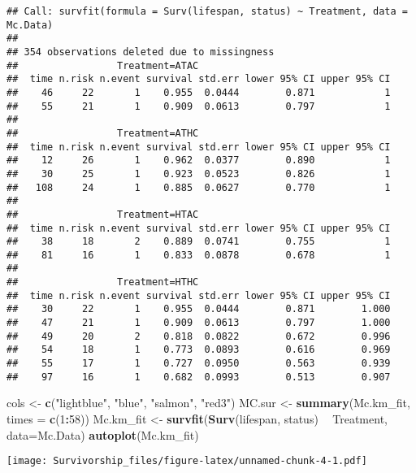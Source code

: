\documentclass[]{article}
\newenvironment{Shaded}{\begin{snugshade}}{\end{snugshade}}
\newcommand{\KeywordTok}[1]{\textcolor[rgb]{0.13,0.29,0.53}{\textbf{#1}}}
\newcommand{\DataTypeTok}[1]{\textcolor[rgb]{0.13,0.29,0.53}{#1}}
\newcommand{\DecValTok}[1]{\textcolor[rgb]{0.00,0.00,0.81}{#1}}
\newcommand{\StringTok}[1]{\textcolor[rgb]{0.31,0.60,0.02}{#1}}
\newcommand{\OperatorTok}[1]{\textcolor[rgb]{0.81,0.36,0.00}{\textbf{#1}}}
\newcommand{\NormalTok}[1]{#1}
\begin{document}
\begin{verbatim}
## Call: survfit(formula = Surv(lifespan, status) ~ Treatment, data = Mc.Data)
## 
## 354 observations deleted due to missingness 
##                 Treatment=ATAC 
##  time n.risk n.event survival std.err lower 95% CI upper 95% CI
##    46     22       1    0.955  0.0444        0.871            1
##    55     21       1    0.909  0.0613        0.797            1
## 
##                 Treatment=ATHC 
##  time n.risk n.event survival std.err lower 95% CI upper 95% CI
##    12     26       1    0.962  0.0377        0.890            1
##    30     25       1    0.923  0.0523        0.826            1
##   108     24       1    0.885  0.0627        0.770            1
## 
##                 Treatment=HTAC 
##  time n.risk n.event survival std.err lower 95% CI upper 95% CI
##    38     18       2    0.889  0.0741        0.755            1
##    81     16       1    0.833  0.0878        0.678            1
## 
##                 Treatment=HTHC 
##  time n.risk n.event survival std.err lower 95% CI upper 95% CI
##    30     22       1    0.955  0.0444        0.871        1.000
##    47     21       1    0.909  0.0613        0.797        1.000
##    49     20       2    0.818  0.0822        0.672        0.996
##    54     18       1    0.773  0.0893        0.616        0.969
##    55     17       1    0.727  0.0950        0.563        0.939
##    97     16       1    0.682  0.0993        0.513        0.907
\end{verbatim}

\begin{Shaded}
\begin{Highlighting}[]
\NormalTok{cols <-}\StringTok{ }\KeywordTok{c}\NormalTok{(}\StringTok{"lightblue"}\NormalTok{, }\StringTok{"blue"}\NormalTok{, }\StringTok{"salmon"}\NormalTok{, }\StringTok{"red3"}\NormalTok{)}
\NormalTok{MC.sur <-}\StringTok{ }\KeywordTok{summary}\NormalTok{(Mc.km_fit, }\DataTypeTok{times =} \KeywordTok{c}\NormalTok{(}\DecValTok{1}\OperatorTok{:}\DecValTok{58}\NormalTok{))}
\NormalTok{Mc.km_fit <-}\StringTok{ }\KeywordTok{survfit}\NormalTok{(}\KeywordTok{Surv}\NormalTok{(lifespan, status) }\OperatorTok{~}\StringTok{ }\NormalTok{Treatment, }\DataTypeTok{data=}\NormalTok{Mc.Data)}
\KeywordTok{autoplot}\NormalTok{(Mc.km_fit)}
\end{Highlighting}
\end{Shaded}

\texttt{[image: Survivorship\_files/figure-latex/unnamed-chunk-4-1.pdf]}
\end{document}
